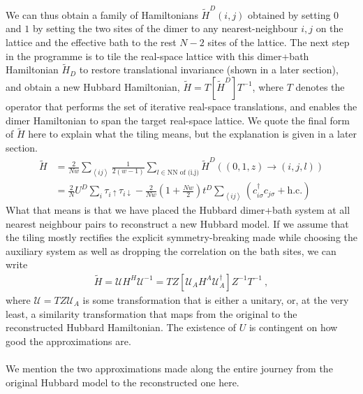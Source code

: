 \documentclass{report}
\numberwithin{equation}{section}
\begin{document}
 We  can thus obtain a family of Hamiltonians \(\tilde H^D(i,j)\) obtained by setting \(0\) and \(1\) by setting the two sites of the dimer to any nearest-neighbour \(i,j\) on the lattice and the effective bath to the rest \(N-2\) sites of the lattice. The next step in the programme is to tile the real-space lattice with this dimer+bath Hamiltonian \(\tilde H_D\) to restore translational invariance (shown in a later section), and obtain a new Hubbard Hamiltonian, $\tilde H = T\left[ \tilde H^{D} \right] T^{-1}$, where $T$ denotes the operator that performs the set of iterative real-space translations, and enables the dimer Hamiltonian to span the target real-space lattice. We quote the final form of $\tilde H$ here to explain what the tiling means, but the explanation is given in a later section.
 \begin{equation}\begin{aligned}
 	\tilde H &= \frac{2}{Nw}\sum_{\left<ij\right>}\frac{1}{2(w-1)}\sum_{l \in \text{NN of (i,j)}}\tilde H^D((0,1,z) \to (i, j, l))\\
 		 &= \frac{2}{N}U^D\sum_{i} \tau_{i \uparrow}\tau_{i \downarrow} - \frac{2}{Nw}\left(1 + \frac{Nw}{2}\right)t^D\sum_{\left<ij\right>}\left(c^\dagger_{i\sigma}c_{j\sigma} + \text{h.c.}\right)
 \end{aligned}\end{equation}
 What that means is that we have placed the Hubbard dimer+bath system at all nearest neighbour pairs to reconstruct a new Hubbard model. If we assume that the tiling mostly rectifies the explicit symmetry-breaking made while choosing the auxiliary system as well as dropping the correlation on the bath sites, we can write
 \begin{equation}\begin{aligned}
 	\tilde H = \mathcal{U} H^H \mathcal{U}^{-1} = TZ\left[\mathcal{U}_A H^A \mathcal{U}_A^\dagger \right]Z^{-1} T^{-1}~,
 \end{aligned}\end{equation}
 where $\mathcal{U} = TZ\mathcal{U}_{A}$ is some transformation that is either a unitary, or, at the very least, a similarity transformation that maps from the original to the reconstructed Hubbard Hamiltonian. 
 The existence of $U$ is contingent on how good the approximations are.
 \\\\
 We mention the two approximations made along the entire journey from the original Hubbard model to the reconstructed one here.
\end{document}
